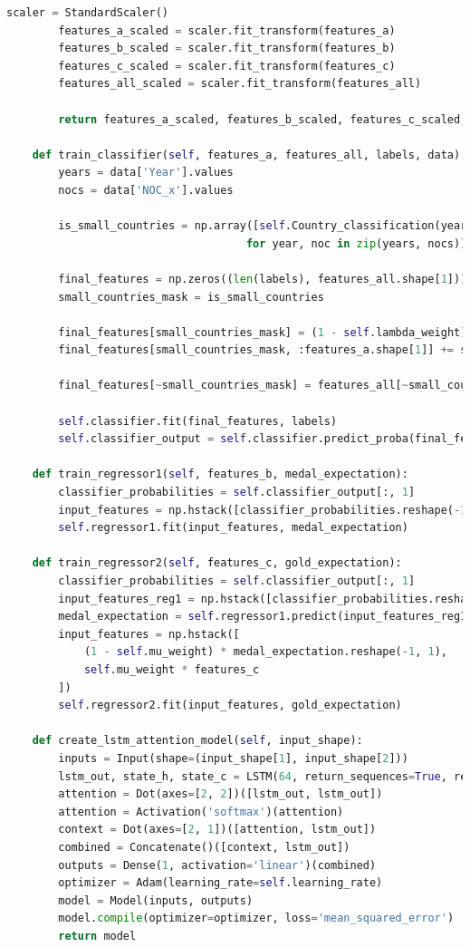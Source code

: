 \documentclass[12pt]{article}
\begin{document}
\begin{lstlisting}[language=Python, style=mystyle, caption=model.ipynb]
        scaler = StandardScaler()
        features_a_scaled = scaler.fit_transform(features_a)
        features_b_scaled = scaler.fit_transform(features_b)
        features_c_scaled = scaler.fit_transform(features_c)
        features_all_scaled = scaler.fit_transform(features_all)

        return features_a_scaled, features_b_scaled, features_c_scaled, features_all_scaled, labels, medal_expectation, gold_expectation

    def train_classifier(self, features_a, features_all, labels, data):
        years = data['Year'].values
        nocs = data['NOC_x'].values

        is_small_countries = np.array([self.Country_classification(year, noc, data)
                                     for year, noc in zip(years, nocs)])

        final_features = np.zeros((len(labels), features_all.shape[1]))
        small_countries_mask = is_small_countries

        final_features[small_countries_mask] = (1 - self.lambda_weight) * features_all[small_countries_mask]
        final_features[small_countries_mask, :features_a.shape[1]] += self.lambda_weight * features_a[small_countries_mask]

        final_features[~small_countries_mask] = features_all[~small_countries_mask]

        self.classifier.fit(final_features, labels)
        self.classifier_output = self.classifier.predict_proba(final_features)

    def train_regressor1(self, features_b, medal_expectation):
        classifier_probabilities = self.classifier_output[:, 1]
        input_features = np.hstack([classifier_probabilities.reshape(-1, 1), features_b])
        self.regressor1.fit(input_features, medal_expectation)

    def train_regressor2(self, features_c, gold_expectation):
        classifier_probabilities = self.classifier_output[:, 1]
        input_features_reg1 = np.hstack([classifier_probabilities.reshape(-1, 1), features_c])
        medal_expectation = self.regressor1.predict(input_features_reg1)
        input_features = np.hstack([
            (1 - self.mu_weight) * medal_expectation.reshape(-1, 1),
            self.mu_weight * features_c
        ])
        self.regressor2.fit(input_features, gold_expectation)

    def create_lstm_attention_model(self, input_shape):
        inputs = Input(shape=(input_shape[1], input_shape[2]))
        lstm_out, state_h, state_c = LSTM(64, return_sequences=True, return_state=True)(inputs)
        attention = Dot(axes=[2, 2])([lstm_out, lstm_out])
        attention = Activation('softmax')(attention)
        context = Dot(axes=[2, 1])([attention, lstm_out])
        combined = Concatenate()([context, lstm_out])
        outputs = Dense(1, activation='linear')(combined)
        optimizer = Adam(learning_rate=self.learning_rate)
        model = Model(inputs, outputs)
        model.compile(optimizer=optimizer, loss='mean_squared_error')
        return model


\end{lstlisting}
\end{document}
